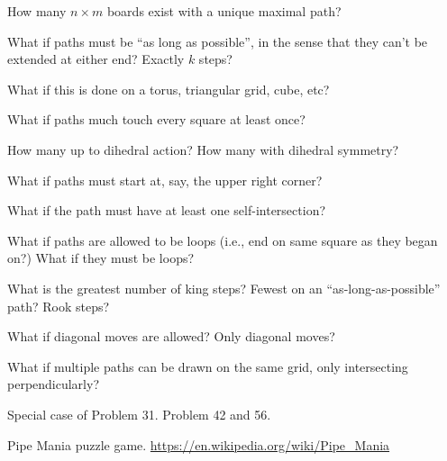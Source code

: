 \documentclass{article}
\begin{document}
\begin{question}
  How many $n \times m$ boards exist with a unique maximal path?
\end{question}

\begin{related}
  \item What if paths must be ``as long as possible'', in the sense that they
    can't be extended at either end? Exactly $k$ steps?
  \item What if this is done on a torus, triangular grid, cube, etc?
  \item What if paths much touch every square at least once?
  \item How many up to dihedral action? How many with dihedral symmetry?
  \item What if paths must start at, say, the upper right corner?
  \item What if the path must have at least one self-intersection?
  \item What if paths are allowed to be loops (i.e., end on same square as they
    began on?) What if they must be loops?
  \item What is the greatest number of king steps?
    Fewest on an ``as-long-as-possible'' path? Rook steps?
  \item What if diagonal moves are allowed? Only diagonal moves?
  \item What if multiple paths can be drawn on the same grid, only intersecting perpendicularly?
\end{related}

\begin{references}
  \item Special case of Problem 31. Problem 42 and 56.
  \item Pipe Mania puzzle game. \url{https://en.wikipedia.org/wiki/Pipe_Mania}
\end{references}
\end{document}
